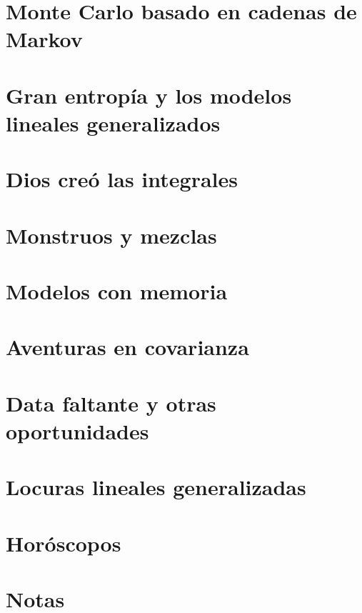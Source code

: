 \documentclass[a4paper,10pt]{book}
\begin{document}
\newpage
\chapter{Monte Carlo basado en cadenas de Markov}


\newpage
\chapter{Gran entrop\'ia y los modelos lineales generalizados}


\newpage
\chapter{Dios cre\'o las integrales}


\newpage
\chapter{Monstruos y mezclas}


\newpage
\chapter{Modelos con memoria}


\newpage
\chapter{Aventuras en covarianza}


\newpage
\chapter{Data faltante y otras oportunidades}


\newpage
\chapter{Locuras lineales generalizadas}


\newpage 
\chapter{Hor\'oscopos}


\newpage 
\chapter{Notas}
\theendnotes
\end{document}

